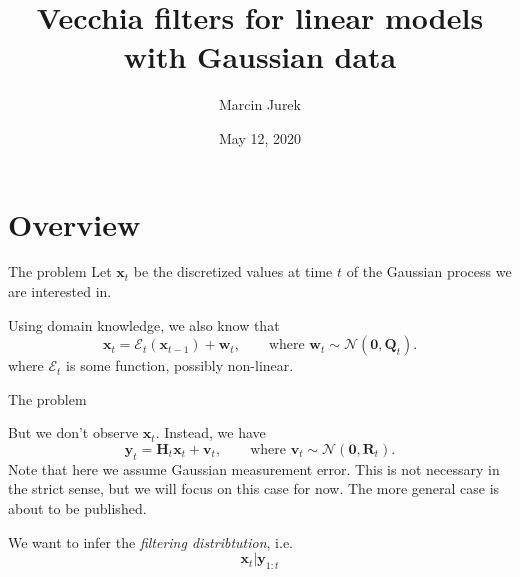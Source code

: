 \documentclass{beamer}
\title[Linear Vecchia filtering]{Vecchia filters for linear models with Gaussian data}
\author{Marcin Jurek}
\institute{Texas A\&M}
\date{May 12, 2020}
\newcommand{\bv}{\mathbf{v}}
\newcommand{\bx}{\mathbf{x}}
\newcommand{\by}{\mathbf{y}}
\newcommand{\bw}{\mathbf{w}}
\newcommand{\bH}{\mathbf{H}}
\newcommand{\bQ}{\mathbf{Q}}
\newcommand{\bR}{\mathbf{R}}
\newcommand{\bfzero}{\mathbf{0}}
\begin{document}
\begin{frame}
  \titlepage
\end{frame}


\section{Overview}

\begin{frame}{The problem}
    Let $\bx_t$ be the discretized values at time $t$ of the Gaussian process we are interested in.
    
    \vspace{1cm}
    Using domain knowledge, we also know that
    $$
    \bx_t = \mathcal{E}_t(\bx_{t-1}) + \bw_t, \quad\quad \text{where } \bw_t \sim \mathcal{N}(\bfzero, \bQ_t).
    $$
    where $\mathcal{E}_t$ is some function, possibly non-linear.
    
\end{frame}

\begin{frame}{The problem}


But we don't observe $\bx_t$. Instead, we have
$$
\by_t = \bH_t\bx_t + \bv_t, \quad\quad \text{where } \bv_t \sim \mathcal{N}(\bfzero, \bR_t).
$$
Note that here we assume Gaussian measurement error. This is not necessary in the strict sense, but we will focus on this case for now. The more general case is about to be published.

\vspace{1cm}
We want to infer the \emph{filtering distribtution}, i.e.
$$
\bx_t | \by_{1:t} 
$$

\end{frame}
\end{document}
